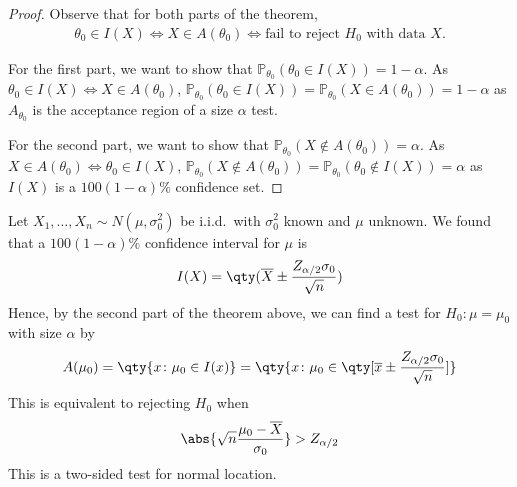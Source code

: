 \begin{proof}
	Observe that for both parts of the theorem,
	\begin{align*}
		\theta_0 \in I(X) \iff X \in A(\theta_0) \iff \text{fail to reject } H_0 \text{ with data } X.
	\end{align*}

	For the first part, we want to show that $\mathbb{P}_{\theta_0} (\theta_0 \in I(X)) = 1 - \alpha$.
	As $\theta_0 \in I(X) \iff X \in A(\theta_0)$, $\mathbb{P}_{\theta_0} (\theta_0 \in I(X)) = \mathbb{P}_{\theta_0}(X \in A(\theta_0)) = 1 - \alpha$ as $A_{\theta_0}$ is the acceptance region of a size $\alpha$ test.

	For the second part, we want to show that $\mathbb{P}_{\theta_0} (X \notin A(\theta_0)) = \alpha$.
	As $X \in A(\theta_0) \iff \theta_0 \in I(X)$, $\mathbb{P}_{\theta_0}(X \notin A(\theta_0)) = \mathbb{P}_{\theta_0} (\theta_0 \notin I(X)) = \alpha$ as $I(X)$ is a $100(1-\alpha)\%$ confidence set.
\end{proof}

\begin{example}
	Let $X_1, \dots, X_n \sim N(\mu, \sigma_0^2)$ be i.i.d.\ with $\sigma_0^2$ known and $\mu$ unknown.
	We found that a $100(1-\alpha)\%$ confidence interval for $\mu$ is
	\begin{align*}
		I(X) = \qty(\overline X \pm \frac{Z_{\alpha/2}\sigma_0}{\sqrt{n}})
	\end{align*}
	Hence, by the second part of the theorem above, we can find a test for $H_0 \colon \mu = \mu_0$ with size $\alpha$ by
	\begin{align*}
		A(\mu_0) = \qty{ x \colon \mu_0 \in I(x) } = \qty{ x \colon \mu_0 \in \qty[\overline x \pm \frac{Z_{\alpha/2} \sigma_0}{\sqrt{n}}] }
	\end{align*}
	This is equivalent to rejecting $H_0$ when
	\begin{align*}
		\abs{\sqrt{n} \frac{\mu_0 - \overline X}{\sigma_0}} > Z_{\alpha/2}
	\end{align*}
	This is a two-sided test for normal location.
\end{example}
